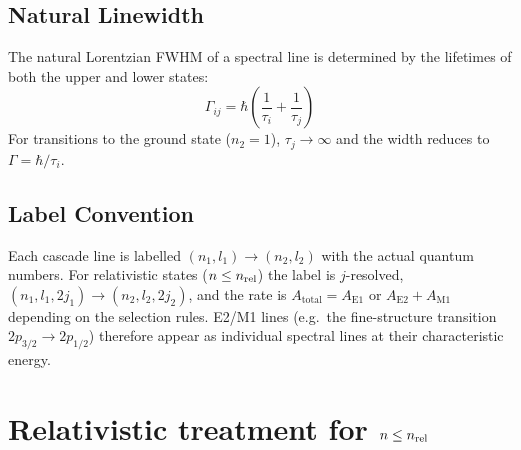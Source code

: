 \documentclass[11pt,a4paper]{article}
\begin{document}
\subsection{Natural Linewidth}

The natural Lorentzian FWHM of a spectral line is determined by the
lifetimes of both the upper and lower states:
\begin{equation}
  \Gamma_{ij} = \hbar \left(\frac{1}{\tau_i} + \frac{1}{\tau_j}\right)
  \label{eq:width}
\end{equation}
For transitions to the ground state ($n_2 = 1$), $\tau_j \to \infty$
and the width reduces to $\Gamma = \hbar / \tau_i$.

\subsection{Label Convention}

Each cascade line is labelled $(n_1,l_1) \to (n_2,l_2)$ with the
actual quantum numbers.  For relativistic states ($n \le n_{\rm rel}$)
the label is $j$-resolved, $(n_1,l_1,2j_1) \to (n_2,l_2,2j_2)$, and
the rate is $A_{\text{total}} = A_{\text{E1}}$ or
$A_{\text{E2}}+A_{\text{M1}}$ depending on the
selection rules.  E2/M1 lines (e.g.\ the fine-structure transition
$2p_{3/2}\to2p_{1/2}$) therefore appear as individual spectral lines
at their characteristic energy.

\section{Relativistic treatment for $n \le n_{\rm rel}$}
\end{document}
